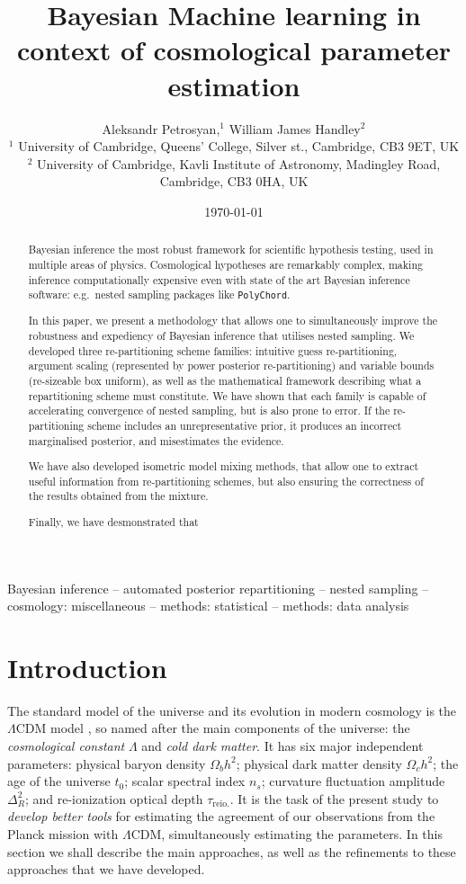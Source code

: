 \documentclass[usenatbib]{mnras}
\author[A. Petrosyan and W. J. Handley]{
  Aleksandr Petrosyan,$^{1}$
  William James Handley$^{2}$
  \\
  $^{1}$ University of Cambridge, Queens' College, Silver st., Cambridge, CB3 9ET, UK\\
  $^{2}$ University of Cambridge, Kavli Institute of Astronomy, Madingley Road, Cambridge, CB3 0HA, UK 
}
\date{\today}
\title[Accelerated Bayesian inference]{Bayesian Machine learning in context of cosmological parameter estimation}
\begin{document}
\maketitle
\begin{abstract}
  Bayesian inference the most robust framework for scientific
  hypothesis testing, used in multiple areas of physics. Cosmological
  hypotheses are remarkably complex, making inference computationally
  expensive even with state of the art Bayesian inference software:
  e.g.~nested sampling packages like \texttt{PolyChord}.

  In this paper, we present a methodology that allows one to
  simultaneously improve the robustness and expediency of Bayesian
  inference that utilises nested sampling. We developed three
  re-partitioning scheme families: intuitive guess re-partitioning,
  argument scaling (represented by power posterior re-partitioning)
  and variable bounds (re-sizeable box uniform), as well as the
  mathematical framework describing what a repartitioning scheme must
  constitute. We have shown that each family is capable of
  accelerating convergence of nested sampling, but is also prone to
  error. If the re-partitioning scheme includes an unrepresentative
  prior, it produces an incorrect marginalised posterior, and
  misestimates the evidence.

  We have also developed isometric model mixing methods, that allow
  one to extract useful information from re-partitioning schemes, but
  also ensuring the correctness of the results obtained from the
  mixture.

  Finally, we have desmonstrated that 
\end{abstract}

\begin{keywords}
Bayesian inference -- automated posterior repartitioning -- nested sampling -- cosmology: miscellaneous -- methods: statistical -- methods: data analysis
\end{keywords}

\section{Introduction}\label{sec:org14413d7}

The standard model of the universe and its evolution in modern
cosmology is the \(\Lambda\)CDM model \citep{Condon2018}, so named
after the main components of the universe: the \emph{cosmological constant} \(\Lambda\)
and \emph{cold dark matter}. It has six major independent parameters:
physical baryon density \(\Omega_{b}h^{2}\); physical dark matter
density \(\Omega_{c}h^{2}\); the age of the universe \(t_{0}\); scalar
spectral index \(n_{s}\); curvature fluctuation amplitude
\(\Delta_{R}^{2}\); and re-ionization optical depth \(\tau_\text{reio.}\). It is the
task of the present study to \emph{develop better tools} for estimating
the agreement of our observations from the Planck mission with
\(\Lambda\)CDM, simultaneously estimating the parameters. In this
section we shall describe the main approaches, as well as the
refinements to these approaches that we have developed.
\end{document}
